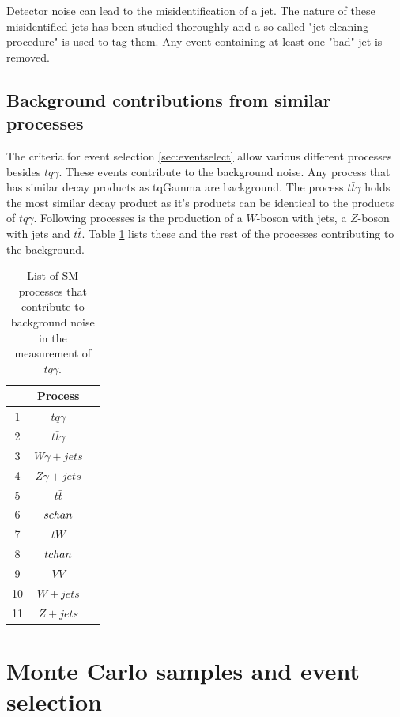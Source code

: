 Detector noise can lead to the misidentification of a jet. The nature of these misidentified jets has been studied thoroughly \cite{70} and a so-called "jet cleaning procedure" is used to tag them. 
Any event containing at least one "bad" jet is removed. 



\section{Background contributions from similar processes}


The criteria for event selection \ref{sec:eventselect} allow various different processes besides $tq\gamma$. These events contribute to the background noise. Any process that has similar decay products as tqGamma are background. 
The process $t\bar{t}\gamma$ holds the most similar decay product as it's products can be identical to the products of $tq\gamma$. Following processes is the production of a $W$-boson with jets, a $Z$-boson with jets and $t\bar{t}$. 
Table \ref{tab:background} lists these and the rest of the processes contributing to the background.
\begin{table}
    \centering
    \begin{tabular}{c c c}
        \toprule
        {} & Process \\
        \midrule
        1 & $tq\gamma$\\[.1cm]
        2 & $t\bar{t}\gamma$\\[.1cm]
        3 & $W\gamma + jets$\\[.1cm]
        4 & $Z\gamma + jets$\\[.1cm]
        5 & $t\bar{t}$\\[.1cm]
        6 & $s\-chan$\\[.1cm]
        7 & $t W$\\[.1cm]
        8 & $t\-chan$\\[.1cm]
        9 & $VV$\\[.1cm]
        10& $W+jets$\\[.1cm]
        11& $Z+jets$\\[.1cm]
        \bottomrule
    \end{tabular}
    \caption{List of SM processes that contribute to background noise in the measurement of $tq\gamma$.}
    \label{tab:background}
\end{table}



\chapter{Monte Carlo samples and event selection}
